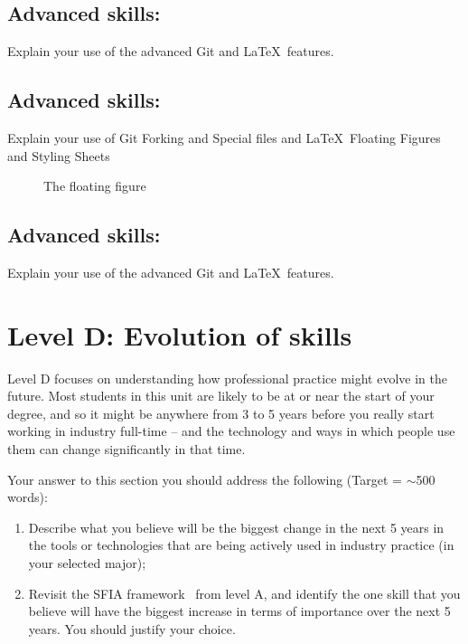 \documentclass[a4paper, 11pt]{report}
\begin{document}
\subsection{Advanced skills: \studB}

Explain your use of the advanced Git and \LaTeX\ features. 

\subsection{Advanced skills: \studC}

Explain your use of Git Forking and Special files and \LaTeX\ Floating Figures and Styling Sheets

\begin{figure}[b]
The floating figure
\end{figure}

\subsection{Advanced skills: \studD}

Explain your use of the advanced Git and \LaTeX\ features. 




\newpage
\section{Level D: Evolution of skills}

Level D focuses on understanding how professional practice might evolve in the future. Most students in this unit are likely to be at or near the start of your degree, and so it might be anywhere from 3 to 5 years before you really start working in industry full-time -- and the technology and ways in which people use them can change significantly in that time. 

Your answer to this section you should address the following (Target = $\sim$500 words):
\begin{enumerate}
	\item Describe what you believe will be the biggest change in the next 5 years in the tools or technologies that are being actively used in industry practice (in your selected major);
	\item Revisit the SFIA framework~\cite{sfia} from level A, and identify the one skill that you believe will have the biggest increase in terms of importance over the next 5 years. You should justify your choice.
\end{enumerate}
\end{document}
